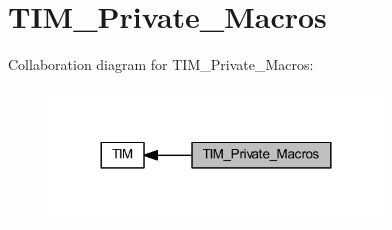\hypertarget{group___t_i_m___private___macros}{}\section{T\+I\+M\+\_\+\+Private\+\_\+\+Macros}
\label{group___t_i_m___private___macros}
Collaboration diagram for T\+I\+M\+\_\+\+Private\+\_\+\+Macros\+:
\nopagebreak
\begin{figure}[H]
\begin{center}
\leavevmode
\includegraphics[width=252pt]{group___t_i_m___private___macros}
\end{center}
\end{figure}
